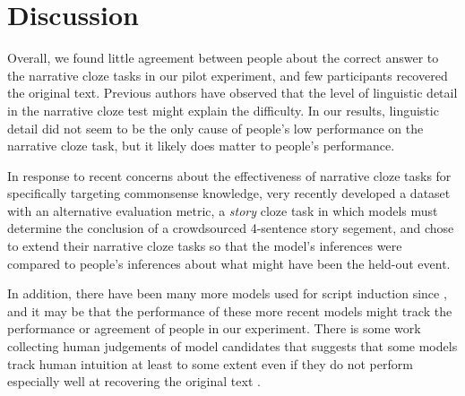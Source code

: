 \documentclass[10pt,a4paper]{article}
\begin{document}
\section{Discussion}

Overall, we found little agreement between people about the correct answer to the narrative cloze tasks in our pilot experiment, and few participants recovered the original text. Previous authors have observed that the level of linguistic detail in the narrative cloze test might explain the difficulty. In our results, linguistic detail did not seem to be the only cause of people's low performance on the narrative cloze task, but it likely does matter to people's performance.


In response to recent concerns about the effectiveness of narrative cloze tasks for specifically targeting commonsense knowledge,  very recently developed a dataset with an alternative evaluation metric, a {\em story} cloze task in which models must determine the conclusion of a crowdsourced 4-sentence story segement, and  chose to extend their narrative cloze tasks so that the model's inferences were compared to people's inferences about what might have been the held-out event.



In addition, there have been many more models used for script induction since , and it may be that the performance of these more recent models might track the performance or agreement of people in our experiment. There is some work collecting human judgements of model candidates that suggests that some models track human intuition at least to some extent even if they do not perform especially well at recovering the original text \cite{pichotta2016learning}.
\end{document}
